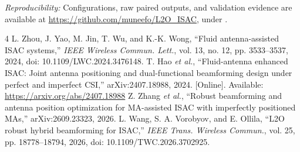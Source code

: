 \documentclass[10pt,journal,onecolumn,draftclsnofoot]{IEEEtran}
\begin{document}
\noindent\emph{Reproducibility:} Configurations, raw paired outputs, and validation evidence are available at \url{https://github.com/muneefo/L2O_ISAC}, under .

\begin{thebibliography}{4}
 L. Zhou, J. Yao, M. Jin, T. Wu, and K.-K. Wong, ``Fluid antenna-assisted ISAC systems,'' \emph{IEEE Wireless Commun. Lett.}, vol. 13, no. 12, pp. 3533--3537, 2024, doi: 10.1109/LWC.2024.3476148.
 T. Hao \emph{et al.}, ``Fluid-antenna enhanced ISAC: Joint antenna positioning and dual-functional beamforming design under perfect and imperfect CSI,'' arXiv:2407.18988, 2024. [Online]. Available: \url{https://arxiv.org/abs/2407.18988}
 Z. Zhang \emph{et al.}, ``Robust beamforming and antenna position optimization for MA-assisted ISAC with imperfectly positioned MAs,'' arXiv:2609.23323, 2026.
 L. Wang, S. A. Vorobyov, and E. Ollila, ``L2O robust hybrid beamforming for ISAC,'' \emph{IEEE Trans. Wireless Commun.}, vol. 25, pp. 18778--18794, 2026, doi: 10.1109/TWC.2026.3702925.
\end{thebibliography}
\end{document}
